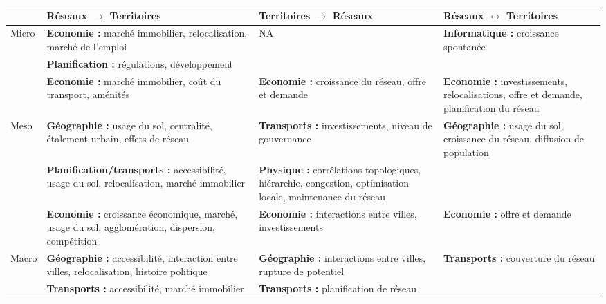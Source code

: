 \begin{table}
{\begin{tabular}{|l|p{5cm}|p{5cm}|p{5cm}|}
\hline
 & Réseaux $\rightarrow$ Territoires & Territoires $\rightarrow$ Réseaux & Réseaux $\leftrightarrow$ Territoires\\ \hline
\multirow{2}{*}{Micro} &
\textbf{Economie : } marché immobilier, relocalisation, marché de l'emploi & NA & \textbf{Informatique : } croissance spontanée \\\cline{2-2}
& \textbf{Planification : } régulations, développement & & \\\hline
& \textbf{Economie : } marché immobilier, coût du transport, aménités & \textbf{Economie : } croissance du réseau, offre et demande & \textbf{Economie : } investissements, relocalisations, offre et demande, planification du réseau\\\cline{2-4}
\multirow{2}{*}{Meso}& \textbf{Géographie : } usage du sol, centralité, étalement urbain, effets de réseau & \textbf{Transports : } investissements, niveau de gouvernance & \textbf{Géographie : } usage du sol, croissance du réseau, diffusion de population \\\cline{2-3}
& \textbf{Planification/transports : } accessibilité, usage du sol, relocalisation, marché immobilier & \textbf{Physique : } corrélations topologiques, hiérarchie, congestion, optimisation locale, maintenance du réseau & \\\hline
& \textbf{Economie : } croissance économique, marché, usage du sol, agglomération, dispersion, compétition & \textbf{Economie : } interactions entre villes, investissements & \textbf{Economie : } offre et demande \\ \cline{2-4}
\multirow{2}{*}{Macro} & \textbf{Géographie : } accessibilité, interaction entre villes, relocalisation, histoire politique & \textbf{Géographie : } interactions entre villes, rupture de potentiel & \textbf{Transports : } couverture du réseau \\\cline{2-3}
& \textbf{Transports : } accessibilité, marché immobilier & \textbf{Transports : } planification de réseau & \\\hline
\end{tabular}
}
\end{table}


